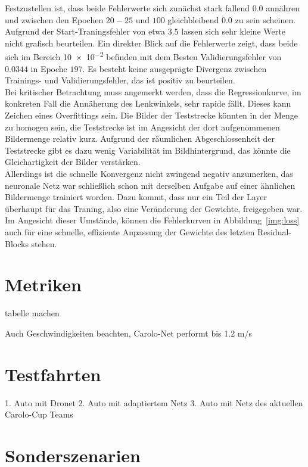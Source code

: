Festzustellen ist, dass beide Fehlerwerte sich zunächst stark fallend $0.0$ annähren und zwischen den Epochen $20-25$ und $100$ gleichbleibend $0.0$ zu sein scheinen. Aufgrund der Start-Traningsfehler von etwa $3.5$ lassen sich sehr kleine Werte nicht grafisch beurteilen. Ein direkter Blick auf die Fehlerwerte zeigt, dass beide sich im Bereich \num{10e-2} befinden mit dem Besten Validierungsfehler von $0.0344$ in Epoche $197$. Es besteht keine ausgeprägte Divergenz zwischen Trainings- und Validierungsfehler, das ist positiv zu beurteilen.\\
Bei kritischer Betrachtung muss angemerkt werden, dass die Regressionkurve, im konkreten Fall die Annäherung des Lenkwinkels, sehr rapide fällt. Dieses kann Zeichen eines Overfittings sein. Die Bilder der Teststrecke könnten in der Menge zu homogen sein, die Teststrecke ist im Angesicht der dort aufgenommenen Bildermenge relativ kurz. Aufgrund der räumlichen Abgeschlossenheit der Teststrecke gibt es dazu wenig Variabilität im Bildhintergrund, das könnte die Gleichartigkeit der Bilder verstärken.\\
Allerdings ist die schnelle Konvergenz nicht zwingend negativ anzumerken, das neuronale Netz war schließlich schon mit derselben Aufgabe auf einer ähnlichen Bildermenge trainiert worden. Dazu kommt, dass nur ein Teil der Layer überhaupt für das Traning, also eine Veränderung der Gewichte, freigegeben war. Im Angesicht dieser Umstände, können die Fehlerkurven in Abbildung~\ref{img:loss} auch für eine schnelle, effiziente Anpassung der Gewichte des letzten Residual-Blocks stehen.




\section{Metriken}

tabelle machen


Auch Geschwindigkeiten beachten, Carolo-Net performt bis 1.2 m/s
\section{Testfahrten}

1. Auto mit Dronet 
2. Auto mit adaptiertem Netz
3. Auto mit Netz des aktuellen Carolo-Cup Teams 

\section{Sonderszenarien}

